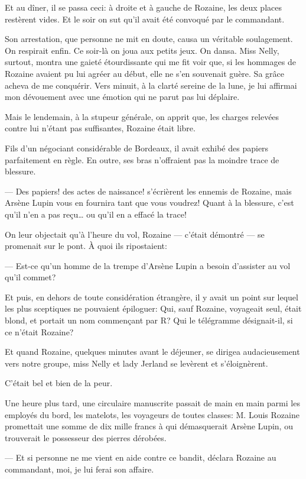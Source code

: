 \documentclass[12pt,a4paper]{article}
\begin{document}
Et au dîner, il se passa ceci: à droite et à gauche de Rozaine, les deux places restèrent vides. Et le soir on sut qu’il avait été convoqué par le commandant.

Son arrestation, que personne ne mit en doute, causa un véritable soulagement. On respirait enfin. Ce soir-là on joua aux petits jeux. On dansa. Miss Nelly, surtout, montra une gaieté étourdissante qui me fit voir que, si les hommages de Rozaine avaient pu lui agréer au début, elle ne s’en souvenait guère. Sa grâce acheva de me conquérir. Vers minuit, à la clarté sereine de la lune, je lui affirmai mon dévouement avec une émotion qui ne parut pas lui déplaire.

Mais le lendemain, à la stupeur générale, on apprit que, les charges relevées contre lui n’étant pas suffisantes, Rozaine était libre.

Fils d’un négociant considérable de Bordeaux, il avait exhibé des papiers parfaitement en règle. En outre, ses bras n’offraient pas la moindre trace de blessure.

— Des papiers! des actes de naissance! s’écrièrent les ennemis de Rozaine, mais Arsène Lupin vous en fournira tant que vous voudrez! Quant à la blessure, c’est qu’il n’en a pas reçu… ou qu’il en a effacé la trace!

On leur objectait qu’à l’heure du vol, Rozaine — c’était démontré — se promenait sur le pont. À quoi ils ripostaient:

— Est-ce qu’un homme de la trempe d’Arsène Lupin a besoin d’assister au vol qu’il commet?

Et puis, en dehors de toute considération étrangère, il y avait un point sur lequel les plus sceptiques ne pouvaient épiloguer: Qui, sauf Rozaine, voyageait seul, était blond, et portait un nom commençant par R? Qui le télégramme désignait-il, si ce n’était Rozaine?

Et quand Rozaine, quelques minutes avant le déjeuner, se dirigea audacieusement vers notre groupe, miss Nelly et lady Jerland se levèrent et s’éloignèrent.

C’était bel et bien de la peur.

Une heure plus tard, une circulaire manuscrite passait de main en main parmi les employés du bord, les matelots, les voyageurs de toutes classes: M. Louis Rozaine promettait une somme de dix mille francs à qui démasquerait Arsène Lupin, ou trouverait le possesseur des pierres dérobées.

— Et si personne ne me vient en aide contre ce bandit, déclara Rozaine au commandant, moi, je lui ferai son affaire. 
\end{document}
